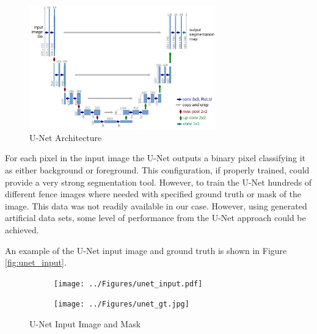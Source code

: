 \documentclass[../Head/Main.tex]{subfiles}
\begin{document}
\begin{figure}[H]
    \centering
    \includegraphics[width=0.72\textwidth]{../Figures/unet_arch.png}
    \caption{U-Net Architecture \cite{UNET_fig}}
    \label{fig:unet_arch}
\end{figure}

For each pixel in the input image the U-Net outputs a binary pixel classifying it as either background or foreground. This configuration, if properly trained, could provide a very strong segmentation tool. However, to train the U-Net hundreds of different fence images where needed with specified ground truth or mask of the image. This data was not readily available in our case. However, using generated artificial data sets, some level of performance from the U-Net approach  could be achieved.
\par
An example of the U-Net input image and ground truth is shown in Figure \autoref{fig:unet_input}.

\begin{figure}[H]
    \centering
    \begin{subfigure}{0.49\textwidth}
        \centering
        \texttt{[image: ../Figures/unet\_input.pdf]}
    \end{subfigure}
    \hfill
    \begin{subfigure}{0.49\textwidth}
        \centering
        \texttt{[image: ../Figures/unet\_gt.jpg]}
    \end{subfigure}
    \caption{U-Net Input Image and Mask}
    \label{fig:unet_input}
\end{figure}

\clearpage
\end{document}
